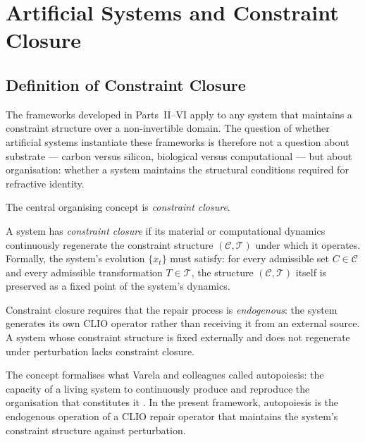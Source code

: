 \documentclass[11pt,openany]{book}
\begin{document}

\chapter{Artificial Systems and Constraint Closure}
\label{ch:artificial}

\section{Definition of Constraint Closure}
\label{sec:closure-definition}

The frameworks developed in Parts~II--VI apply to any
system that maintains a constraint structure over a
non-invertible domain.  The question of whether artificial
systems instantiate these frameworks is therefore not a
question about substrate — carbon versus silicon, biological
versus computational — but about organisation: whether a
system maintains the structural conditions required for
refractive identity.

The central organising concept is \emph{constraint closure}.

\begin{definition}
\label{def:constraint-closure}
A system has \emph{constraint closure} if its material or
computational dynamics continuously regenerate the
constraint structure $(\mathcal{C}, \mathcal{T})$ under
which it operates.  Formally, the system's evolution
$\{x_t\}$ must satisfy: for every admissible set $C \in
\mathcal{C}$ and every admissible transformation $T \in
\mathcal{T}$, the structure $(\mathcal{C}, \mathcal{T})$
itself is preserved as a fixed point of the system's
dynamics.
\end{definition}

\begin{remark}
Constraint closure requires that the repair process is
\emph{endogenous}: the system generates its own CLIO
operator rather than receiving it from an external source.
A system whose constraint structure is fixed externally and
does not regenerate under perturbation lacks constraint
closure.
\end{remark}

The concept formalises what Varela and colleagues called
autopoiesis: the capacity of a living system to continuously
produce and reproduce the organisation that constitutes it
\citep{varela1991embodied}.  In the present framework,
autopoiesis is the endogenous operation of a CLIO repair
operator that maintains the system's constraint structure
against perturbation.
\end{document}
